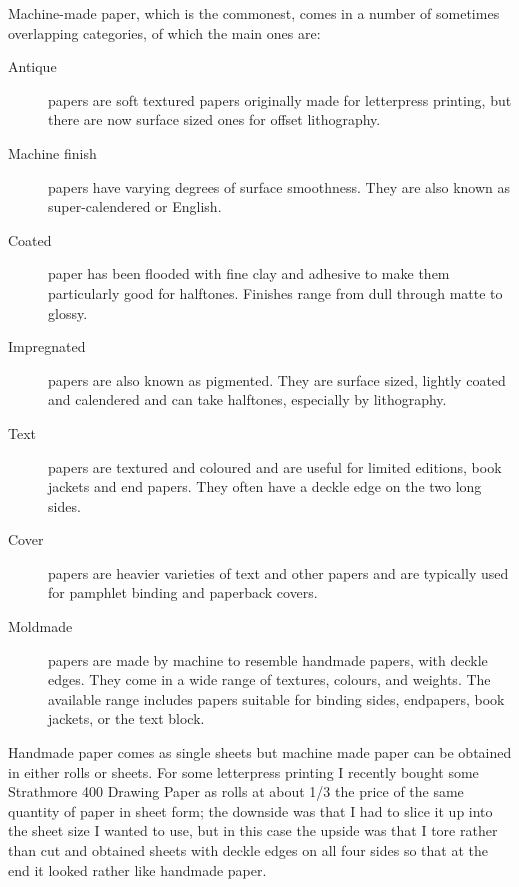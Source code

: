 \documentclass[10pt,a4paper,oneside,extrafontsizes]{memoir}%
\begin{document}

\begin{paracol}{2}
\switchEng
    Machine-made paper, which is the commonest, comes in a number of 
sometimes overlapping categories, of which the main ones are:
\begin{description}
\item[Antique] papers are soft textured papers originally
made for letterpress printing, but there are now surface sized ones for
offset lithography. 
\item[Machine finish] papers have varying degrees 
of surface smoothness. They are also known as 
super-calendered or 
English.
\item[Coated] paper has been flooded with fine clay and
adhesive to make them particularly good for halftones. Finishes range from 
dull through matte to glossy. 
\item[Impregnated] papers are also known as
pigmented. They are surface sized, lightly coated
and calendered and can take halftones, especially by lithography.
\item[Text] papers are textured and coloured and are 
useful for limited editions, book jackets and end papers. They often have 
a deckle edge on the two long sides.
\item[Cover] papers are heavier varieties of text and other
papers and are typically used for pamphlet binding and paperback covers.
\item[Moldmade] papers are made by machine to resemble
handmade papers, with deckle edges. They come in a wide range of textures,
colours, and weights. The available range includes papers suitable for
binding sides, endpapers, book jackets, or the text block.
\end{description}

    Handmade paper comes as single sheets but machine made paper can be 
obtained in either rolls or sheets. For some letterpress printing 
I recently bought some Strathmore 400
Drawing Paper as  rolls at about 1/3 the price of the
same quantity of paper in sheet form; the downside was that I had to slice 
it up into
the sheet size I wanted to use, but in this case the upside was that I tore
rather than cut and obtained sheets with deckle edges on all four sides
so that at the end it looked rather like handmade paper.


\end{paracol}
\end{document}
